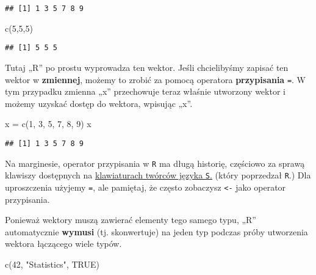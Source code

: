 \documentclass[
]{article}
\newenvironment{Shaded}{\begin{snugshade}}{\end{snugshade}}
\newcommand{\ConstantTok}[1]{\textcolor[rgb]{0.00,0.00,0.00}{#1}}
\newcommand{\DecValTok}[1]{\textcolor[rgb]{0.00,0.00,0.81}{#1}}
\newcommand{\FunctionTok}[1]{\textcolor[rgb]{0.00,0.00,0.00}{#1}}
\newcommand{\NormalTok}[1]{#1}
\newcommand{\OtherTok}[1]{\textcolor[rgb]{0.56,0.35,0.01}{#1}}
\newcommand{\StringTok}[1]{\textcolor[rgb]{0.31,0.60,0.02}{#1}}
\begin{document}
\begin{verbatim}
## [1] 1 3 5 7 8 9
\end{verbatim}

\begin{Shaded}
\begin{Highlighting}[]
\FunctionTok{c}\NormalTok{(}\DecValTok{5}\NormalTok{,}\DecValTok{5}\NormalTok{,}\DecValTok{5}\NormalTok{)}
\end{Highlighting}
\end{Shaded}

\begin{verbatim}
## [1] 5 5 5
\end{verbatim}

Tutaj „R'' po prostu wyprowadza ten wektor. Jeśli chcielibyśmy zapisać
ten wektor w \textbf{zmiennej}, możemy to zrobić za pomocą operatora
\textbf{przypisania} \texttt{=}. W tym przypadku zmienna „x''
przechowuje teraz właśnie utworzony wektor i możemy uzyskać dostęp do
wektora, wpisując „x''.

\begin{Shaded}
\begin{Highlighting}[]
\NormalTok{x }\OtherTok{=} \FunctionTok{c}\NormalTok{(}\DecValTok{1}\NormalTok{, }\DecValTok{3}\NormalTok{, }\DecValTok{5}\NormalTok{, }\DecValTok{7}\NormalTok{, }\DecValTok{8}\NormalTok{, }\DecValTok{9}\NormalTok{)}
\NormalTok{x}
\end{Highlighting}
\end{Shaded}

\begin{verbatim}
## [1] 1 3 5 7 8 9
\end{verbatim}

Na marginesie, operator przypisania w \texttt{R} ma długą historię,
częściowo za sprawą klawiszy dostępnych na
\href{https://twitter.com/kwbroman/\%20status/747829864091127809}{klawiaturach
twórców języka \texttt{S}.} (który poprzedzał \texttt{R}.) Dla
uproszczenia użyjemy \texttt{=}, ale pamiętaj, że często zobaczysz
\texttt{\textless{}-} jako operator przypisania.

Ponieważ wektory muszą zawierać elementy tego samego typu, „R''
automatycznie \textbf{wymusi} (tj. skonwertuje) na jeden typ podczas
próby utworzenia wektora łączącego wiele typów.

\begin{Shaded}
\begin{Highlighting}[]
\FunctionTok{c}\NormalTok{(}\DecValTok{42}\NormalTok{, }\StringTok{"Statistics"}\NormalTok{, }\ConstantTok{TRUE}\NormalTok{)}
\end{Highlighting}
\end{Shaded}
\end{document}
